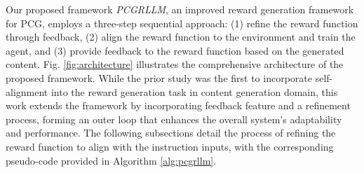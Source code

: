 
Our proposed framework \textit{PCGRLLM}, an improved reward generation framework for PCG, employs a three-step sequential approach: (1) refine the reward function through feedback, (2) align the reward function to the environment and train the agent, and (3) provide feedback to the reward function based on the generated content.
Fig. \ref{fig:architecture} illustrates the comprehensive architecture of the proposed framework.
While the prior study \cite{baek2024chatpcg} was the first to incorporate self-alignment into the reward generation task in content generation domain, this work extends the framework by incorporating feedback feature and a refinement process, forming an outer loop that enhances the overall system's adaptability and performance.
The following subsections detail the process of refining the reward function to align with the instruction inputs, with the corresponding pseudo-code provided in Algorithm \ref{alg:pcgrllm}.


